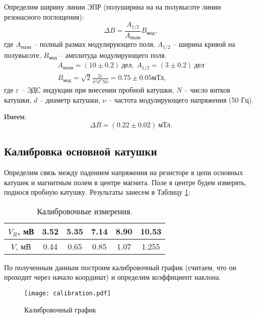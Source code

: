     Определим ширину линии ЭПР (полуширина на на полувысоте линии резонасного поглощения):
    \begin{equation*}
        \Delta B = \frac{A_{1/2}}{A_{\text{полн}}}B_\text{мод},
    \end{equation*}
    где $A_\text{полн}$ -- полный размах модулирующего поля, $A_{1/2}$ -- ширина кривой на полувысоте, $B_\text{мод}$ -- амплитуда модулирующего поля.
    \begin{equation*}
        \begin{gathered}
            A_\text{полн} = (10 \pm 0.2 ) \ \text{дел}, \ A_{1/2} = (3 \pm 0.2) \ \text{дел} \\
            B_\text{мод} = \sqrt{2} \frac{2\varepsilon}{\pi^2d^2N\nu} = 0.75\pm 0.05 \text{мТл},
        \end{gathered}
    \end{equation*}
    где $\varepsilon$ -- ЭДС индукции при внесении пробной катушки, $N$ -- число витков катушки, $d$ -- диаметр катушки, $\nu$ -- частота модулирующего напряжения (50 Гц).
    
    Имеем:
    \[\boxed{\Delta B = (0.22 \pm 0.02) \ \text{мТл}}.\]
    
    \subsection*{Калибровка основной катушки}
    
    Определим связь между падением напряжения на резисторе в цепи основных катушек и магнитным полем в центре магнита. Поле в центре будем измерять, поднося пробную катушку. 
    Результаты занесем в Таблицу \ref{table:field}: 
    
    \begin{table}[h]
    \centering
        \begin{tabular}{|c|c|c|c|c|c|}
        \hline
        $V_R$, мВ              & 3.52 & 5.35 & 7.14 & 8.90 & 10.53 \\ \hline
        $V$, мВ  & 0.44 & 0.65 & 0.85 & 1.07 & 1.255 \\ \hline
        \end{tabular}
    \caption{Калибровочные измерения.}
    \label{table:field}
    \end{table}
    
    По полученным данным построим калибровочный график (считаем, что он проходит через начало координат)
    и определим коэффициент наклона.

    \begin{figure}
        \centering
        \texttt{[image: calibration.pdf]}
        \caption{Калибровочный график}
        \label{fig:calibration}
    \end{figure}

